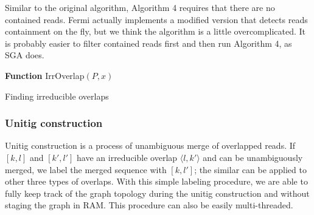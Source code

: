 \documentclass{bioinfo}
\begin{document}
\begin{methods}
Similar to the original algorithm, Algorithm 4 requires that there are no contained reads.
Fermi actually implements a modified version that detects reads containment on the fly,
but we think the algorithm is a little overcomplicated. It is probably easier to
filter contained reads first and then run Algorithm 4, as SGA does.

\begin{algorithm}[h]
\DontPrintSemicolon
\footnotesize
{}
\BlankLine
\textbf{Function} {\sc IrrOverlap}$(P,x)$
\caption{Finding irreducible overlaps}
\end{algorithm}

\subsubsection{Unitig construction}

Unitig construction is a process of unambiguous merge of overlapped reads.
If $[k,l]$ and $[k',l']$ have an irreducible overlap $\langle l,k'\rangle$ and
can be unambiguously merged, we label the merged sequence with $[k,l']$; the
similar can be applied to other three types of overlaps.  With this simple
labeling procedure, we are able to fully keep track of the graph topology
during the unitig construction and without staging the graph in RAM.  This
procedure can also be easily multi-threaded.


\end{methods}
\end{document}
